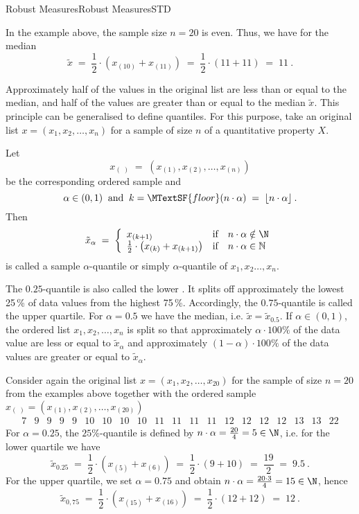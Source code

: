\begin{MXContent}{Robust Measures}{Robust Measures}{STD}
\begin{MExample}
In the example above, the sample size $n=20$ is even. Thus, we have for the median
$$
\tilde{x}\; =\; \frac{1}{2}\cdot \left({x_{(10)}+x_{(11)} }\right)\; =\;\frac{1}{2}\cdot (11 + 11)\; =\; 11\: .
$$
\end{MExample}

Approximately half of the values in the original list are less than or equal to the median, and half of the 
values are greater than or equal to the median $\tilde{x}$. This principle can be generalised to define quantiles. 
For this purpose, take an original list $x=(x_{1},x_{2},\ldots ,x_{n})$ for a sample of size $n$ of a 
quantitative property $X$.

\begin{MInfo}
Let
$$
x_{(\; )}\; =\; (x_{(1)},x_{(2)},\ldots ,x_{(n)})
$$
be the corresponding ordered sample and 
$$
\alpha \in (0,1) \;\;\text{and} \;\; k = \MTextSF{floor}(n\cdot \alpha) \;= \;\lfloor n\cdot \alpha \rfloor\: .
$$
Then 
$$
\tilde{x}_{\alpha }\; =\; \left\lbrace{\begin{array}{lll}x_{(k+1)} & \text{if} & n\cdot \alpha \notin \N \\ \frac{1}{2} \cdot \left(x_{(k)}+x_{(k+1)}\right) & \text{if} & n\cdot \alpha \in \mathbb{N}\end{array}}\right.
$$
is called a sample $\alpha$-quantile or simply $\alpha$-quantile of $x_{1},x_{2}\ldots ,x_{n}$.
\end{MInfo}

The $0.25$-quantile is also called the lower . It splits off approximately 
the lowest 25\,\% of data values from the highest 75\,\%. Accordingly, the $0.75$-quantile is called 
the upper quartile. For $\alpha = 0.5$ we have the median, i.e. $\tilde{x}=\tilde{x}_{0.5}$.
If $\alpha \in (0,1)$, the ordered list $x_{1},x_{2},\ldots ,x_{n}$ is split so that 
approximately $\alpha\cdot 100\%$ of the data value are less or equal to $\tilde{x}_{\alpha}$ and 
approximately  $(1-\alpha)\cdot 100\%$ of the data values are greater or equal to $\tilde{x}_{\alpha}$.


\begin{MExample}
Consider again the original list $x=(x_{1},x_{2},\ldots ,x_{20})$ for the sample of size $n=20$ from the examples 
above together with the ordered sample $x_{(\; )}=(x_{(1)},x_{(2)},\ldots ,x_{(20)})$
$$
\begin{array}{cccccccccccccccccccc} 7 & 9 & 9 & 9 & 9 & 10 & 10 & 10 & 10 & 11 & 11 & 11 & 11 & 12 & 12 & 12 & 12 & 13 & 13 & 22 \end{array}
$$
For $\alpha = 0.25$, the $25\%$-quantile is defined by $n\cdot \alpha = \frac{20}{4}=5\in \N$, i.e. for the 
lower quartile we have
$$
\tilde{x}_{0.25}\;=\;  \frac{1}{2}\cdot\left( x_{(5)}+x_{(6)} \right)\; =\;\frac{1}{2}\cdot (9+10)\; =\; \frac{19}{2}\; =\; 9.5\: .
$$
For the upper quartile, we set $\alpha = 0.75$ and obtain 
$n\cdot \alpha = \frac{20\cdot 3}{4}=15\in \N$, hence
$$
\tilde{x}_{0,75}\;=\;\frac{1}{2}\cdot\left( x_{(15)}+x_{(16)} \right) \;=\;\frac{1}{2}\cdot (12+12)\;=\;12\: .
$$
\end{MExample}


\end{MXContent}
